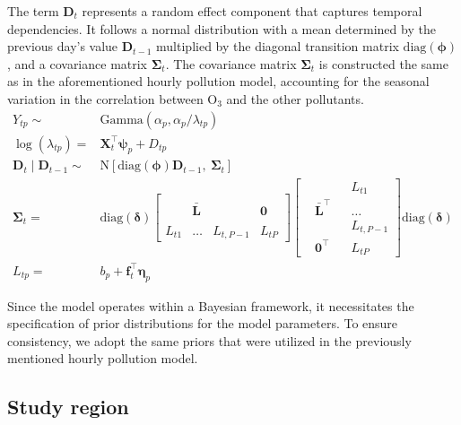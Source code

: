 \documentclass[
  12,
]{article}
\begin{document}
The term \(\mathbf{D}_t\) represents a random effect component that
captures temporal dependencies. It follows a normal distribution with a
mean determined by the previous day's value \(\mathbf{D}_{t-1}\)
multiplied by the diagonal transition matrix
\(\text{diag}(\mathbf{\phi})\), and a covariance matrix
\(\mathbf{\Sigma}_t\). The covariance matrix \(\mathbf{\Sigma}_t\) is
constructed the same as in the aforementioned hourly pollution model,
accounting for the seasonal variation in the correlation between O\(_3\)
and the other pollutants. \begin{equation}\label{eqnPollutiondaily}
\begin{aligned}
   Y_{tp} \sim & \mbox{Gamma}
   \left( \alpha_p, \alpha_p / \lambda_{tp} \right) \\
  \log{(\lambda_{tp})}  = & \mathbf{X}_{t}^{\top}\mathbf{\psi}_{p} + D_{tp} \\
    \mathbf{D}_{t}  \mid \mathbf{D}_{t-1}   \sim & \mbox{N}\left[\mbox{diag}(\mathbf{\phi})  \mathbf{D}_{t-1} ,\ \mathbf{\Sigma}_t \right]\\
\mathbf{\Sigma}_t  = &  \mbox{diag}(\mathbf{\delta}) \left[
\begin{array}{cccc}
 &  &  &  \\
 & \mathbf{\bar{L}}  &   &  {\mathbf{0}}  \\ 
  &  &  &  \\
 L_{t1} & \dots & L_{t,P-1}  &  L_{tP}
\end{array}\right] \left[
\begin{array}{cccc}
 &  &  &  L_{t1} \\
 & \mathbf{\bar{L}}^{\top}  &   &  \dots  \\ 
  &  &  & L_{t,P-1} \\
  & {\mathbf{0}}^{\top} &   &  L_{tP}
\end{array}\right] \mbox{diag}(\mathbf{\delta}) \\
L_{tp}  = &  b_p + \mathbf{f}_t ^{\top}\mathbf{\eta}_p
  \end{aligned}
\end{equation}

Since the model operates within a Bayesian framework, it necessitates
the specification of prior distributions for the model parameters. To
ensure consistency, we adopt the same priors that were utilized in the
previously mentioned hourly pollution model.

\hypertarget{study-region}{%
\subsection{Study region}\label{study-region}}
\end{document}
